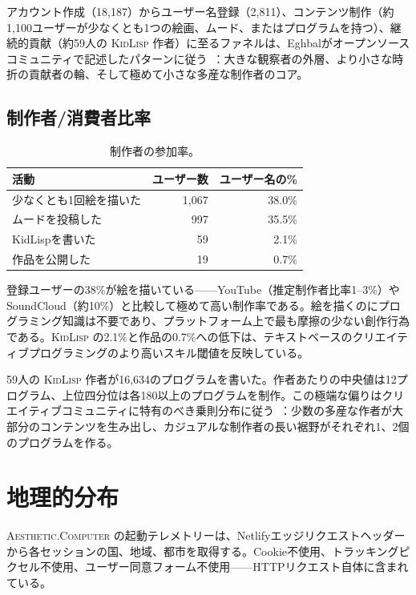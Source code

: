 \documentclass[10pt,letterpaper,twocolumn]{article}
\newcommand{\ac}{\textsc{Aesthetic.Computer}}
\newcommand{\kl}{\textsc{KidLisp}}
\begin{document}
アカウント作成（18,187）からユーザー名登録（2,811）、コンテンツ制作（約1,100ユーザーが少なくとも1つの絵画、ムード、またはプログラムを持つ）、継続的貢献（約59人の \kl{} 作者）に至るファネルは、Eghbalがオープンソースコミュニティで記述したパターンに従う~\citep{eghbal2020working}：大きな観察者の外層、より小さな時折の貢献者の輪、そして極めて小さな多産な制作者のコア。

\subsection{制作者/消費者比率}

\begin{table}[h]
\small
\centering
\begin{tabularx}{\columnwidth}{Xrr}
\toprule
\textbf{活動} & \textbf{ユーザー数} & \textbf{ユーザー名の\%} \\
\midrule
少なくとも1回絵を描いた & 1,067 & 38.0\% \\
ムードを投稿した & 997 & 35.5\% \\
KidLispを書いた & 59 & 2.1\% \\
作品を公開した & 19 & 0.7\% \\
\bottomrule
\end{tabularx}
\caption{制作者の参加率。}
\label{tab:creators}
\end{table}

登録ユーザーの38\%が絵を描いている——YouTube（推定制作者比率1--3\%）やSoundCloud（約10\%）と比較して極めて高い制作率である。絵を描くのにプログラミング知識は不要であり、プラットフォーム上で最も摩擦の少ない創作行為である。\kl{} の2.1\%と作品の0.7\%への低下は、テキストベースのクリエイティブプログラミングのより高いスキル閾値を反映している。

59人の \kl{} 作者が16,634のプログラムを書いた。作者あたりの中央値は12プログラム、上位四分位は各180以上のプログラムを制作。この極端な偏りはクリエイティブコミュニティに特有のべき乗則分布に従う~\citep{barabasi1999emergence}：少数の多産な作者が大部分のコンテンツを生み出し、カジュアルな制作者の長い裾野がそれぞれ1、2個のプログラムを作る。

\section{地理的分布}

\ac{} の起動テレメトリーは、Netlifyエッジリクエストヘッダーから各セッションの国、地域、都市を取得する。Cookie不使用、トラッキングピクセル不使用、ユーザー同意フォーム不使用——HTTPリクエスト自体に含まれている。
\end{document}
